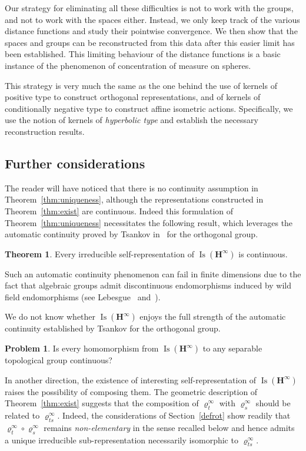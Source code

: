 \documentclass[11pt]{article}
\theoremstyle{definition}
\numberwithin{equation}{section}
\numberwithin{figure}{section}
\numberwithin{table}{section}
\newtheorem{imain}{Theorem}
\newtheorem*{iprob*}{Problem}
\newcommand{\HHI}{\mathbf{H}^{\infty}}
\newcommand{\Isomi}{{\Isom}(\HHI)}
\DeclareMathOperator{\Isom}{Is}
\newcommand{\ro}{\varrho}
\begin{document}
Our strategy for eliminating all these difficulties is not to work with the groups, and not to work with the spaces either. Instead, we only keep track of the various distance functions and study their pointwise convergence. We then show that the spaces and groups can be reconstructed from this data after this easier limit has been established. This limiting behaviour of the distance functions is a basic instance of the phenomenon of concentration of measure on spheres.

This strategy is very much the same as the one behind the use of kernels of positive type to construct orthogonal representations, and of kernels of conditionally negative type to construct affine isometric actions. Specifically, we use the notion of kernels of \emph{hyperbolic type} and establish the necessary reconstruction results.

\subsection{Further considerations}

The reader will have noticed that there is no continuity assumption in Theorem~\ref{thm:uniqueness}, although the representations constructed in Theorem~\ref{thm:exist} are continuous. Indeed this formulation of Theorem~\ref{thm:uniqueness} necessitates the following result, which leverages the automatic continuity proved by Tsankov in~\cite{Tsankov13} for the orthogonal group.

\begin{imain}\label{thm:auto}
Every irreducible self-representation of $\Isomi$ is continuous.
\end{imain}

Such an automatic continuity phenomenon can fail in finite dimensions due to the fact that algebraic groups admit discontinuous endomorphisms induced by wild field endomorphisms (see Lebesgue~\cite[p.~533]{Lebesgue07} and~\cite{Kestelman51}).

We do not know whether $\Isomi$ enjoys the full strength of the automatic continuity established by Tsankov for the orthogonal group.

\begin{iprob*}
Is every homomorphism from $\Isomi$ to any separable topological group continuous?
\end{iprob*}

In another direction, the existence of interesting self-representation of $\Isomi$ raises the possibility of composing them. The geometric description of Theorem~\ref{thm:exist} suggests that the composition of $\ro^\infty_t$ with $\ro^\infty_s$ should be related to $\ro^\infty_{ts}$. Indeed, the considerations of Section~\ref{defrot} show readily that $\ro^\infty_t\circ \ro^\infty_s$ remains \emph{non-elementary} in the sense recalled below and hence admits a unique irreducible sub-representation necessarily isomorphic to $\ro^\infty_{ts}$.
\end{document}
